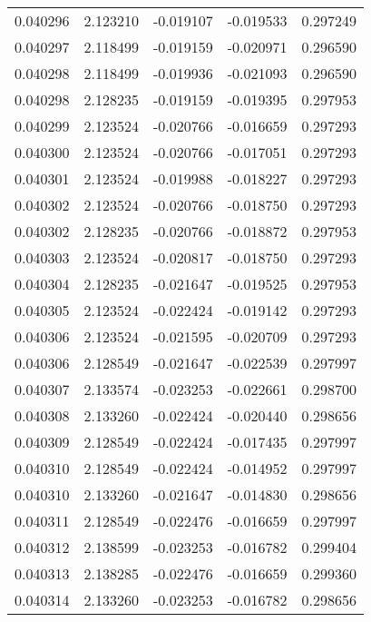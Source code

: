 \begin{tabular}{lrrrr}
0.040296    &  2.123210 & -0.019107 & -0.019533 &             0.297249 \\
0.040297    &  2.118499 & -0.019159 & -0.020971 &             0.296590 \\
0.040298    &  2.118499 & -0.019936 & -0.021093 &             0.296590 \\
0.040298    &  2.128235 & -0.019159 & -0.019395 &             0.297953 \\
0.040299    &  2.123524 & -0.020766 & -0.016659 &             0.297293 \\
0.040300    &  2.123524 & -0.020766 & -0.017051 &             0.297293 \\
0.040301    &  2.123524 & -0.019988 & -0.018227 &             0.297293 \\
0.040302    &  2.123524 & -0.020766 & -0.018750 &             0.297293 \\
0.040302    &  2.128235 & -0.020766 & -0.018872 &             0.297953 \\
0.040303    &  2.123524 & -0.020817 & -0.018750 &             0.297293 \\
0.040304    &  2.128235 & -0.021647 & -0.019525 &             0.297953 \\
0.040305    &  2.123524 & -0.022424 & -0.019142 &             0.297293 \\
0.040306    &  2.123524 & -0.021595 & -0.020709 &             0.297293 \\
0.040306    &  2.128549 & -0.021647 & -0.022539 &             0.297997 \\
0.040307    &  2.133574 & -0.023253 & -0.022661 &             0.298700 \\
0.040308    &  2.133260 & -0.022424 & -0.020440 &             0.298656 \\
0.040309    &  2.128549 & -0.022424 & -0.017435 &             0.297997 \\
0.040310    &  2.128549 & -0.022424 & -0.014952 &             0.297997 \\
0.040310    &  2.133260 & -0.021647 & -0.014830 &             0.298656 \\
0.040311    &  2.128549 & -0.022476 & -0.016659 &             0.297997 \\
0.040312    &  2.138599 & -0.023253 & -0.016782 &             0.299404 \\
0.040313    &  2.138285 & -0.022476 & -0.016659 &             0.299360 \\
0.040314    &  2.133260 & -0.023253 & -0.016782 &             0.298656 \\

\end{tabular}
